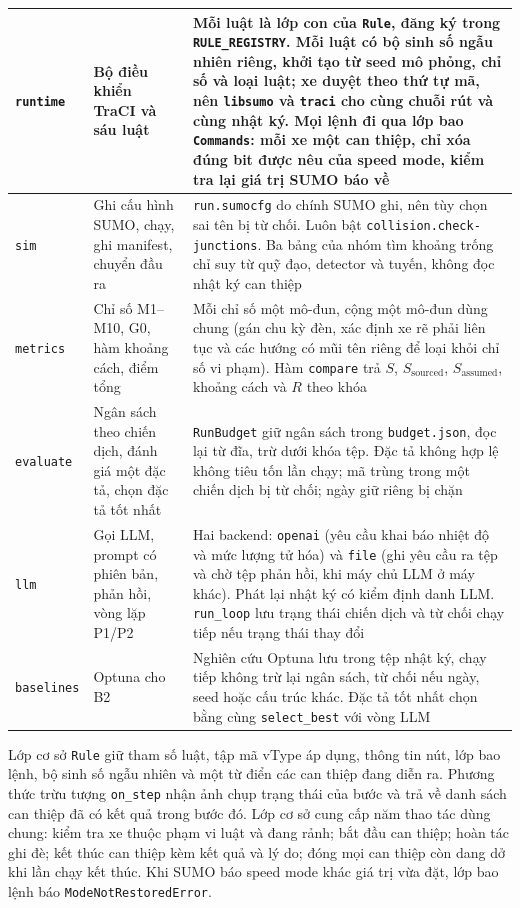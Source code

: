 \documentclass[../main.tex]{subfiles}
\begin{document}
\begin{longtable}{|>{\raggedright\arraybackslash}p{2.3cm}|>{\raggedright\arraybackslash}p{4.2cm}|>{\raggedright\arraybackslash}p{7.1cm}|}
\texttt{runtime} & Bộ điều khiển TraCI và sáu luật & Mỗi luật là lớp con của \texttt{Rule}, đăng ký trong \texttt{RULE\_REGISTRY}. Mỗi luật có bộ sinh số ngẫu nhiên riêng, khởi tạo từ seed mô phỏng, chỉ số và loại luật; xe duyệt theo thứ tự mã, nên \texttt{libsumo} và \texttt{traci} cho cùng chuỗi rút và cùng nhật ký. Mọi lệnh đi qua lớp bao \texttt{Commands}: mỗi xe một can thiệp, chỉ xóa đúng bit được nêu của speed mode, kiểm tra lại giá trị SUMO báo về \\ \hline
\texttt{sim} & Ghi cấu hình SUMO, chạy, ghi manifest, chuyển đầu ra & \texttt{run.sumocfg} do chính SUMO ghi, nên tùy chọn sai tên bị từ chối. Luôn bật \texttt{collision.check-junctions}. Ba bảng của nhóm tìm khoảng trống chỉ suy từ quỹ đạo, detector và tuyến, không đọc nhật ký can thiệp \\ \hline
\texttt{metrics} & Chỉ số M1--M10, G0, hàm khoảng cách, điểm tổng & Mỗi chỉ số một mô-đun, cộng một mô-đun dùng chung (gán chu kỳ đèn, xác định xe rẽ phải liên tục và các hướng có mũi tên riêng để loại khỏi chỉ số vi phạm). Hàm \texttt{compare} trả $S$, $S_{\text{sourced}}$, $S_{\text{assumed}}$, khoảng cách và $R$ theo khóa \\ \hline
\texttt{evaluate} & Ngân sách theo chiến dịch, đánh giá một đặc tả, chọn đặc tả tốt nhất & \texttt{RunBudget} giữ ngân sách trong \texttt{budget.json}, đọc lại từ đĩa, trừ dưới khóa tệp. Đặc tả không hợp lệ không tiêu tốn lần chạy; mã trùng trong một chiến dịch bị từ chối; ngày giữ riêng bị chặn \\ \hline
\texttt{llm} & Gọi LLM, prompt có phiên bản, phản hồi, vòng lặp P1/P2 & Hai backend: \texttt{openai} (yêu cầu khai báo nhiệt độ và mức lượng tử hóa) và \texttt{file} (ghi yêu cầu ra tệp và chờ tệp phản hồi, khi máy chủ LLM ở máy khác). Phát lại nhật ký có kiểm định danh LLM. \texttt{run\_loop} lưu trạng thái chiến dịch và từ chối chạy tiếp nếu trạng thái thay đổi \\ \hline
\texttt{baselines} & Optuna cho B2 & Nghiên cứu Optuna lưu trong tệp nhật ký, chạy tiếp không trừ lại ngân sách, từ chối nếu ngày, seed hoặc cấu trúc khác. Đặc tả tốt nhất chọn bằng cùng \texttt{select\_best} với vòng LLM \\ \hline
\end{longtable}
\endgroup

Lớp cơ sở \texttt{Rule} giữ tham số luật, tập mã vType áp dụng, thông tin nút, lớp bao lệnh, bộ sinh số ngẫu nhiên và một từ điển các can thiệp đang diễn ra. Phương thức trừu tượng \texttt{on\_step} nhận ảnh chụp trạng thái của bước và trả về danh sách can thiệp đã có kết quả trong bước đó. Lớp cơ sở cung cấp năm thao tác dùng chung: kiểm tra xe thuộc phạm vi luật và đang rảnh; bắt đầu can thiệp; hoàn tác ghi đè; kết thúc can thiệp kèm kết quả và lý do; đóng mọi can thiệp còn dang dở khi lần chạy kết thúc. Khi SUMO báo speed mode khác giá trị vừa đặt, lớp bao lệnh báo \texttt{ModeNotRestoredError}.
\end{document}
